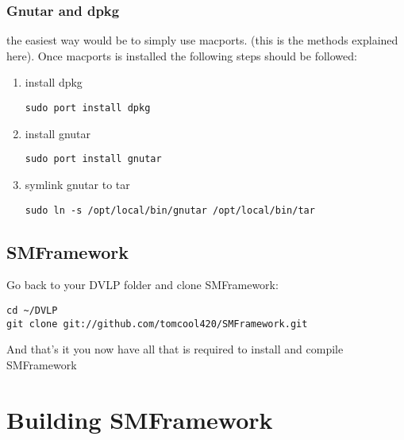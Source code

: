\documentclass[11pt]{article}
\begin{document}
\subsubsection{Gnutar and dpkg}
the easiest way would be to simply use macports. (this is the methods explained here). Once macports is installed the following steps should be followed:
\begin{enumerate}
\item install dpkg
\begin{lstlisting}
sudo port install dpkg
\end{lstlisting}
\item install gnutar
\begin{lstlisting}
sudo port install gnutar
\end{lstlisting}
\item symlink gnutar to tar 
\begin{lstlisting}
sudo ln -s /opt/local/bin/gnutar /opt/local/bin/tar
\end{lstlisting}
\end{enumerate}
\subsection{SMFramework}
Go back to your DVLP folder and clone SMFramework:
\begin{lstlisting}
cd ~/DVLP
git clone git://github.com/tomcool420/SMFramework.git
\end{lstlisting}
And that's it you now have all that is required to install and compile SMFramework
\section{Building SMFramework}
\end{document}
